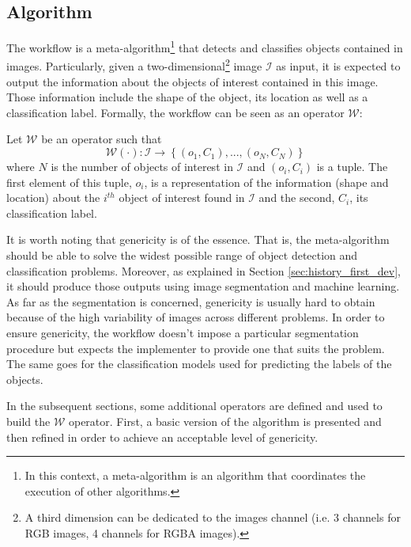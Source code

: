 \subsection{Algorithm}
\label{ssec:workflow_algo}
The workflow is a meta-algorithm\footnote{In this context, a meta-algorithm is an algorithm that coordinates the execution of other algorithms.} that detects and classifies objects contained in images. Particularly, given a two-dimensional\footnote{A third dimension can be dedicated to the images channel (i.e. 3 channels for RGB images, 4 channels for RGBA images).} image $\mathcal{I}$ as input, it is expected to output the information about the objects of interest contained in this image. Those information include the shape of the object, its location as well as a classification label. Formally, the workflow can be seen as an operator $\mathcal{W}$:

\begin{definition} Let $\mathcal{W}$ be an operator such that 
	\begin{equation}\label{eqn:workflow_operator}
		\mathcal{W}(\cdot) : \mathcal{I} \rightarrow \left\{(o_1,C_1),...,(o_N, C_N)\right\}
	\end{equation}
	where $N$ is the number of objects of interest in $\mathcal{I}$ and $(o_i, C_i)$ is a tuple. The first element of this tuple, $o_i$, is a representation of the information (shape and location) about the $i^{th}$ object of interest found in $\mathcal{I}$ and the second, $C_i$, its classification label. 
\end{definition}

It is worth noting that genericity is of the essence. That is, the meta-algorithm should be able to solve the widest possible range of object detection and classification problems. Moreover, as explained in Section \ref{sec:history_first_dev}, it should produce those outputs using image segmentation and machine learning. As far as the segmentation is concerned, genericity is usually hard to obtain because of the high variability of images across different problems. In order to ensure genericity, the workflow doesn't impose a particular segmentation procedure but expects the implementer to provide one that suits the problem. The same goes for the classification models used for predicting the labels of the objects. 

In the subsequent sections, some additional operators are defined and used to build the $\mathcal{W}$ operator. First, a basic version of the algorithm is presented and then refined in order to achieve an acceptable level of genericity.

